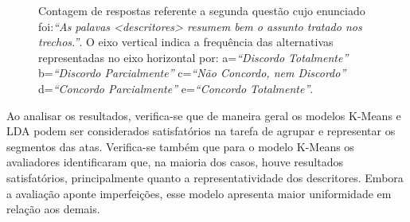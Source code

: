 \begin{figure}[!h] \centering     %

	\caption{Contagem de respostas referente a segunda questão cujo enunciado foi:\textit{``As palavas <descritores> resumem bem o assunto tratado nos trechos.''}. O eixo vertical indica a frequência das alternativas representadas no eixo horizontal por:
		a=\textit{``Discordo Totalmente''}
		b=\textit{``Discordo Parcialmente''}
		c=\textit{``Não Concordo, nem Discordo''}
		d=\textit{``Concordo Parcialmente''}
		e=\textit{``Concordo Totalmente''}.
	}
	\label{fig:Q2}
\end{figure}


Ao analisar os resultados, verifica-se que de maneira geral os modelos K-Means e LDA podem ser considerados satisfatórios na tarefa de agrupar e representar os segmentos das atas.
Verifica-se também que para o modelo K-Means os avaliadores identificaram que, na maioria dos casos, houve resultados satisfatórios, principalmente quanto a representatividade dos descritores. Embora a avaliação aponte imperfeições, esse modelo apresenta maior uniformidade em relação aos demais.



